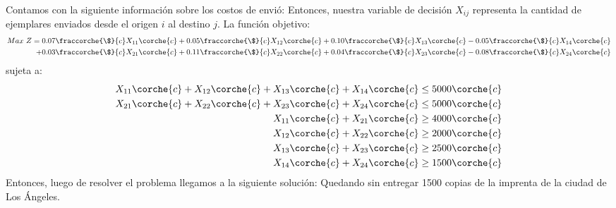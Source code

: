 
\begin{homeworkProblem}
Contamos con la siguiente información sobre los costos de envió:
Entonces, nuestra variable de decisión $X_{ij}$ representa la cantidad de ejemplares enviados desde el origen $i$ al destino $j$.
La función objetivo:
\begin{align*}
    Max\ Z = 
    0.07\fraccorche{\$}{c}X_{11}\corche{c} + 
    0.05\fraccorche{\$}{c}X_{12}\corche{c} +
    0.10\fraccorche{\$}{c}X_{13}\corche{c} -
    0.05\fraccorche{\$}{c}X_{14}\corche{c}\\ +
    0.03\fraccorche{\$}{c}X_{21}\corche{c} +
    0.11\fraccorche{\$}{c}X_{22}\corche{c} +
    0.04\fraccorche{\$}{c}X_{23}\corche{c} -
    0.08\fraccorche{\$}{c}X_{24}\corche{c} 
\end{align*}
sujeta a:
\begin{align*}
   X_{11}\corche{c} + X_{12}\corche{c} +    X_{13}\corche{c} + X_{14}\corche{c} \le 5000\corche{c} \\
   X_{21}\corche{c} + X_{22}\corche{c} +    X_{23}\corche{c} + X_{24}\corche{c} \le 5000\corche{c} \\
   X_{11}\corche{c} + X_{21}\corche{c}  \ge 4000\corche{c} \\
   X_{12}\corche{c} + X_{22}\corche{c}  \ge 2000\corche{c} \\
   X_{13}\corche{c} + X_{23}\corche{c}  \ge 2500\corche{c} \\
   X_{14}\corche{c} + X_{24}\corche{c}  \ge 1500\corche{c}
\end{align*}
Entonces, luego de resolver el problema llegamos a la siguiente solución:
Quedando sin entregar 1500 copias de la imprenta de la ciudad de Los Ángeles.
\end{homeworkProblem}


